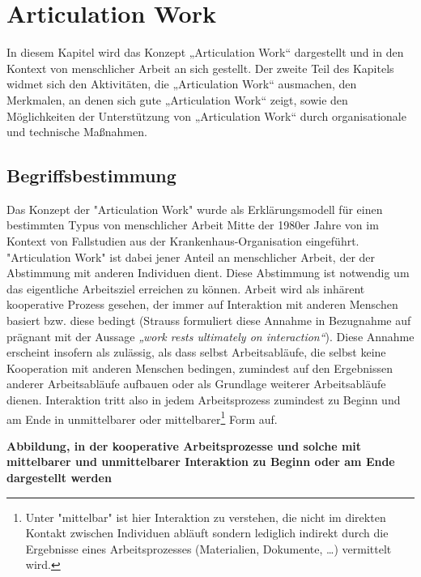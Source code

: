\chapter{Articulation Work} %
\label{cha:articulation_work}

In diesem Kapitel wird das Konzept „Articulation Work“ dargestellt und in den Kontext von menschlicher Arbeit an sich gestellt. Der zweite Teil des Kapitels widmet sich den Aktivitäten, die „Articulation Work“ ausmachen, den Merkmalen, an denen sich gute „Articulation Work“ zeigt, sowie den Möglichkeiten der Unterstützung von „Articulation Work“ durch organisationale und technische Maßnahmen.

\section{Begriffsbestimmung} %
\label{sec:aw_begriffsbestimmung}

Das Konzept der "Articulation Work" wurde als Erklärungsmodell für einen bestimmten Typus von menschlicher Arbeit Mitte der 1980er Jahre von  \citet{Strauss85} im Kontext von Fallstudien aus der Krankenhaus-Organisation eingeführt. "Articulation Work" ist dabei jener Anteil an menschlicher Arbeit, der der Abstimmung mit anderen Individuen dient. Diese Abstimmung ist notwendig um das eigentliche Arbeitsziel erreichen zu können. Arbeit wird als inhärent kooperative Prozess gesehen, der immer auf Interaktion mit anderen Menschen basiert bzw. diese bedingt (Strauss formuliert diese Annahme in Bezugnahme auf \citet{Hughes71} prägnant mit der Aussage \emph{„work rests ultimately on interaction“}). Diese Annahme erscheint insofern als zulässig, als dass selbst Arbeitsabläufe, die selbst keine Kooperation mit anderen Menschen bedingen, zumindest auf den Ergebnissen anderer Arbeitsabläufe aufbauen oder als Grundlage weiterer Arbeitsabläufe dienen. Interaktion tritt also in jedem Arbeitsprozess zumindest zu Beginn und am Ende in unmittelbarer oder mittelbarer\footnote{Unter "mittelbar" ist hier Interaktion zu verstehen, die nicht im direkten Kontakt zwischen Individuen abläuft sondern lediglich indirekt durch die Ergebnisse eines Arbeitsprozesses (Materialien, Dokumente, \ldots) vermittelt wird.} Form auf.

\textbf{Abbildung, in der kooperative Arbeitsprozesse und solche mit mittelbarer und unmittelbarer Interaktion zu Beginn oder am Ende dargestellt werden}

